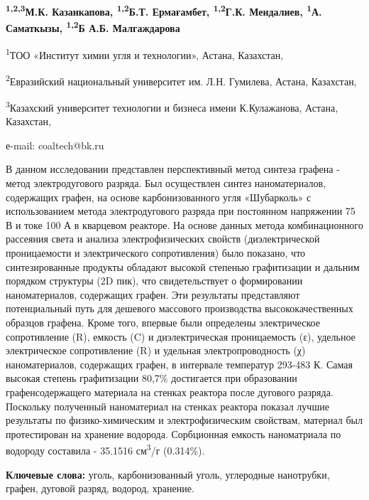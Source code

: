 
\begin{center}
{\bfseries \textsuperscript{1,2,3}М.К. Казанкапова,
\textsuperscript{1,2}Б.Т. Ермағамбет, \textsuperscript{1,2}Г.К.
Мендалиев, \textsuperscript{1}А. Саматкызы, \textsuperscript{1,2}Б А.Б.
Малгаждарова}

\textsuperscript{1}ТОО «Институт химии угля и технологии», Астана,
Казахстан,

\textsuperscript{2}Евразийский национальный университет им. Л.Н.
Гумилева, Астана, Казахстан,

\textsuperscript{3}Казахский университет технологии и бизнеса имени
К.Кулажанова, Астана, Казахстан,

е-mail: coaltech@bk.ru
\end{center}

В данном исследовании представлен перспективный метод синтеза графена -
метод электродугового разряда. Был осуществлен синтез наноматериалов,
содержащих графен, на основе карбонизованного угля «Шубарколь» с
использованием метода электродугового разряда при постоянном напряжении
75 В и токе 100 А в кварцевом реакторе. На основе данных метода
комбинационного рассеяния света и анализа электрофизических свойств
(диэлектрической проницаемости и электрического сопротивления) было
показано, что синтезированные продукты обладают высокой степенью
графитизации и дальним порядком структуры (2D пик), что свидетельствует
о формировании наноматериалов, содержащих графен. Эти результаты
представляют потенциальный путь для дешевого массового производства
высококачественных образцов графена. Кроме того, впервые были определены
электрическое сопротивление (R), емкость (C) и диэлектрическая
проницаемость (ε), удельное электрическое сопротивление (R) и удельная
электропроводность (χ) наноматериалов, содержащих графен, в интервале
температур 293-483 К. Самая высокая степень графитизации 80,7\%
достигается при образовании графенсодержащего материала на стенках
реактора после дугового разряда. Поскольку полученный наноматериал на
стенках реактора показал лучшие результаты по физико-химическим и
электрофизическим свойствам, материал был протестирован на хранение
водорода. Сорбционная емкость наноматриала по водороду составила -
35.1516 см\textsuperscript{3}/г (0.314\%).

{\bfseries Ключевые слова:} уголь, карбонизованный уголь, углеродные
нанотрубки, графен, дуговой разряд, водород, хранение.

